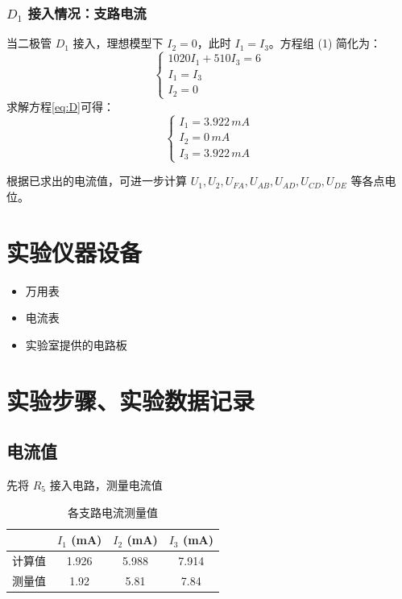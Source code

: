 \documentclass{Report} %
\begin{document}
\subsubsection{$D_1$ 接入情况：支路电流}
当二极管 $D_1$ 接入，理想模型下 $I_2 = 0$，此时 $I_1 = I_3$。方程组 (1) 简化为：
\begin{equation}
\begin{cases}
1020I_1 + 510I_3 = 6 \\
I_1 = I_3 \\
I_2 = 0
\end{cases}
\label{eq:D}
\end{equation}
求解方程\cref{eq:D}可得：
\begin{equation}
\begin{cases}
I_1 = 3.922\,mA \\
I_2 = 0\,mA \\
I_3 = 3.922\,mA
\end{cases}
\end{equation}

根据已求出的电流值，可进一步计算 $U_1, U_2, U_{FA}, U_{AB}, U_{AD}, U_{CD}, U_{DE}$ 等各点电位。
\section{实验仪器设备}
\begin{itemize}
    \item 万用表
    \item 电流表
    \item 实验室提供的电路板
\end{itemize}
\section{实验步骤、实验数据记录}
\subsection{电流值}

先将 $R_5$ 接入电路，测量电流值

\begin{table}[H] %
    \centering %
    \caption{各支路电流测量值}
    \begin{tabular}{lccc}
        \toprule
                   & $I_1$ (mA) & $I_2$ (mA) & $I_3$ (mA) \\
        \midrule
        计算值 & 1.926      & 5.988      & 7.914      \\
        测量值 & 1.92       & 5.81       & 7.84       \\
        \bottomrule
    \end{tabular}
\end{table}
\end{document}
